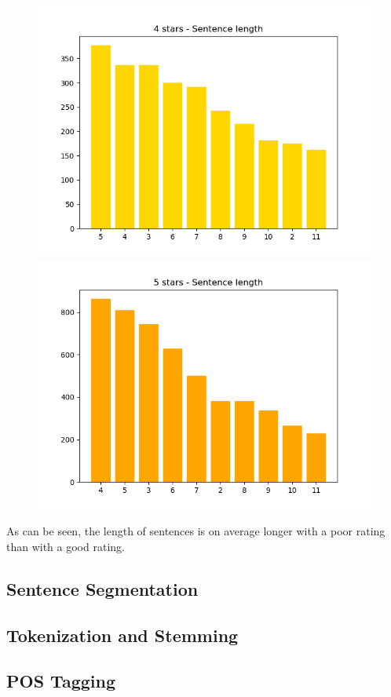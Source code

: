 \documentclass[sigchi]{acmart}
\begin{document}
\begin{figure}
		\includegraphics[scale=0.3]{figures/4stars-Sentencelength.png}
		\includegraphics[scale=0.3]{figures/5stars-Sentencelength.png}
	\end{figure}
	As can be seen, the length of sentences is on average longer with a poor rating than with a good rating. 
	
	\subsection{Sentence Segmentation}
	\subsection{Tokenization and Stemming}
	\subsection{POS Tagging}
\end{document}
